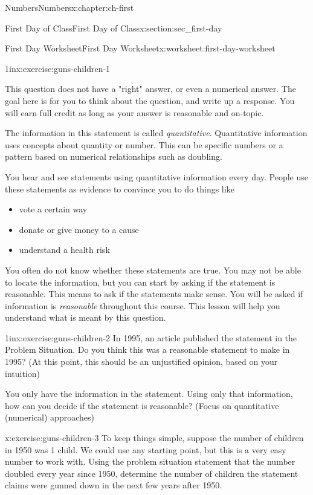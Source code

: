 \documentclass[twoside,10pt,]{book}
\numberwithin{equation}{chapter}
\begin{document}
\begin{chapterptx}{Numbers}{}{Numbers}{}{}{x:chapter:ch-first}
\begin{sectionptx}{First Day of Class}{}{First Day of Class}{}{}{x:section:sec_first-day}
\begin{worksheet-subsection}{First Day Worksheet}{}{First Day Worksheet}{}{}{x:worksheet:first-day-worksheet}
\begin{exercisegroup}
\begin{divisionexerciseeg}{12}{}{1in}{x:exercise:guns-children-1}
\par
This question does not have a "right" answer, or even a numerical answer. The goal here is for you to think about the question, and write up a response. You will earn full credit as long as your answer is reasonable and on-topic.%
\end{divisionexerciseeg}%
\end{exercisegroup}
\par\medskip\noindent
The information in this statement is called \emph{quantitative}. Quantitative information uses concepts about quantity or number. This can be specific numbers or a pattern based on numerical relationships such as doubling.%
\par
You hear and see statements using quantitative information every day. People use these statements as evidence to convince you to do things like%
%
\begin{itemize}[label=\textbullet]
\item{}vote a certain way%
\item{}donate or give money to a cause%
\item{}understand a health risk%
\end{itemize}
You often do not know whether these statements are true. You may not be able to locate the information, but you can start by asking if the statement is reasonable. This means to ask if the statements make sense. You will be asked if information is \emph{reasonable} throughout this course. This lesson will help you understand what is meant by this question.%
\begin{divisionexercise}{13}{}{1in}{x:exercise:guns-children-2}%
In 1995, an article published the statement in the Problem Situation. Do you think this was a reasonable statement to make in 1995? (At this point, this should be an unjustified opinion, based on your intuition)%
\par
You only have the information in the statement. Using only that information, how can you decide if the statement is reasonable? (Focus on quantitative (numerical) approaches)%
\end{divisionexercise}%
\clearpage
\begin{divisionexercise}{14}{}{}{x:exercise:guns-children-3}%
To keep things simple, suppose the number of children in 1950 was 1 child. We could use any starting point, but this is a very easy number to work with. Using the problem situation statement that the number doubled every year since 1950, determine the number of children the statement claims were gunned down in the next few years after 1950.%

\end{divisionexercise}
\end{worksheet-subsection}
\end{sectionptx}
\end{chapterptx}
\end{document}
